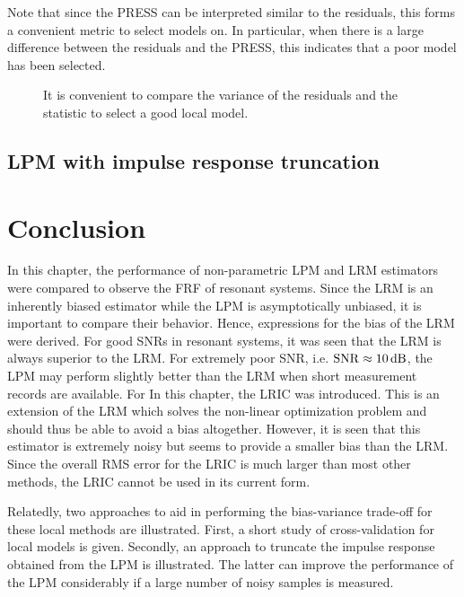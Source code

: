 Note that since the \gls{PRESS} can be interpreted similar to the residuals, this forms a convenient metric to select models on.
In particular, when there is a large difference between the residuals and the \gls{PRESS}, this indicates that a poor model has been selected.

\begin{figure}
  \centering
  \setlength{\figurewidth}{0.85\columnwidth}
  \setlength{\figureheight}{0.62\figurewidth}
  \caption[Output spectrum for local modeling, together the PRESS statistic]{It is convenient to compare the variance of the residuals and the  statistic to select a good local model.}
  \label{fig:nparam:PRESS}
\end{figure}


\subsection{LPM with impulse response truncation}


\section{Conclusion}
\label{sec:conclusion}
In this chapter, the performance of non-parametric \gls{LPM} and \gls{LRM} estimators were compared to observe the \gls{FRF} of resonant systems.
Since the \gls{LRM} is an inherently biased estimator while the \gls{LPM} is asymptotically unbiased, it is important to compare their behavior.
Hence, expressions for the bias of the \gls{LRM} were derived.
For good \glspl{SNR} in resonant systems, it was seen that the \gls{LRM} is always superior to the \gls{LRM}.
For extremely poor \gls{SNR}, i.e. $\mathrm{SNR} \approx 10\,\mathrm{dB}$, the \gls{LPM} may perform slightly better than the \gls{LRM} when short measurement records are available.
For
In this chapter, the \gls{LRIC} was introduced.
This is an extension of the \gls{LRM} which solves the non-linear optimization problem and should thus be able to avoid a bias altogether.
However, it is seen that this estimator is extremely noisy but seems to provide a smaller bias than the \gls{LRM}.
Since the overall \gls{RMS} error for the \gls{LRIC} is much larger than most other methods, the \gls{LRIC} cannot be used in its current form.

Relatedly, two approaches to aid in performing the bias-variance trade-off for these local methods are illustrated.
First, a short study of cross-validation for local models is given.
Secondly, an approach to truncate the impulse response obtained from the \gls{LPM} is illustrated.
The latter can improve the performance of the \gls{LPM} considerably if a large number of noisy samples is measured.


% 
